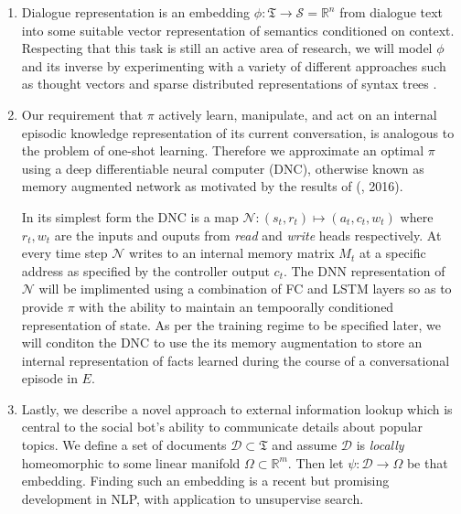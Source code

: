 \documentclass{article} %
\theoremstyle{named}
\def\scriptd{{\mathcal D}}
\def\scriptn{{\mathcal N}}
\def\scripts{{\mathcal S}}
\begin{document}
\begin{enumerate}
\item Dialogue representation is an embedding $ \phi: \mathfrak{T} \to \scripts = \mathbb{R}^n $ from dialogue text into some suitable vector representation of semantics conditioned on context. Respecting that this task is still an active area of research, we will model $ \phi $ and its inverse by experimenting with a variety of different approaches such as thought vectors \cite{NIPS2015_5950} and sparse distributed representations of syntax trees \cite{DBLP:journals/corr/YogatamaFDS14}.

\item Our requirement that $ \pi $ actively learn, manipulate, and act on an internal episodic knowledge representation of its current conversation, is analogous to the problem of one-shot learning. Therefore we approximate an optimal $ \pi $ using a deep differentiable neural computer (DNC)\cite{graves2016hybrid}\cite{DBLP:journals/corr/GravesWD14}, otherwise known as memory augmented network as motivated by the results of (\citeauthor{DBLP:journals/corr/SantoroBBWL16}, 2016).

In its simplest form the DNC is a map $\scriptn: (s_t, r_t) \mapsto (a_t, c_t, w_t)$ where  $r_t, w_t$ are the inputs and ouputs from \emph{read} and \emph{write} heads respectively. At every time step $\scriptn$ writes to an internal memory matrix $M_t$ at a specific address as specified by the controller output $c_t$. The DNN representation of $\scriptn$ will be implimented using a combination of FC and LSTM layers so as to provide $\pi$ with the ability to maintain an tempoorally conditioned representation of state. As per the training regime to be specified later, we will conditon the DNC to use the its memory augmentation to store an internal representation of facts learned during the course of a conversational episode in $E$.


\item Lastly, we describe a novel approach to external information lookup which is central to the social bot's ability to communicate details about popular topics. We define a set of documents $\scriptd \subset \mathfrak{T}$ and assume $\scriptd$ is \emph{locally} homeomorphic to some linear manifold $\Omega \subset \mathbb{R}^m$. Then let $\psi: \scriptd \to \Omega$ be that embedding. Finding such an embedding is a recent but promising development in NLP, with application to unsupervise search\cite{DBLP:journals/corr/DaiOL15}.


\end{enumerate}
\end{document}
